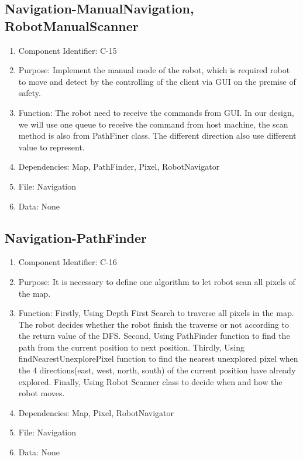 \documentclass[11pt, a4paper]{report}
\begin{document}
\subsection{Navigation-ManualNavigation, RobotManualScanner}
\begin{enumerate}
\item Component Identifier: C-15
\item Purpose: Implement the manual mode of the robot, which is required robot to move and detect by the controlling of the client via GUI on the premise of safety.
\item Function: The robot need to receive the commands from GUI. In our design, we will use one queue to receive the command from host machine, the scan method is also from PathFiner class. The different direction also use different value to represent.
\item Dependencies: Map, PathFinder, Pixel, RobotNavigator
\item File: Navigation
\item Data: None
\end{enumerate}

\subsection{Navigation-PathFinder}
\begin{enumerate}
\item Component Identifier: C-16
\item Purpose: It is necessary to define one algorithm to let robot scan all pixels of the map.
\item Function: Firstly, Using Depth First Search to traverse all pixels in the map. The robot decides whether the robot finish the traverse or not according to the return value of the DFS. Second, Using PathFinder function to find the path from the current position to next position. Thirdly, Using findNearestUnexplorePixel function to find the nearest unexplored pixel when the 4
directions(east, west, north, south) of the current position have already explored. Finally, Using Robot Scanner class to decide when and how the robot moves.
\item Dependencies: Map, Pixel, RobotNavigator
\item File: Navigation
\item Data: None
\end{enumerate}
\end{document}
